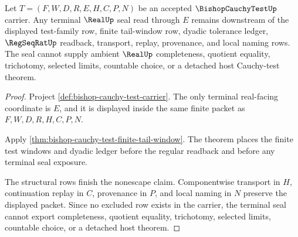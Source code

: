\begin{theorem}
\label{thm:bishop-cauchy-test-real-seal-nonescape}
Let $T=(F,W,D,R,E,H,C,P,N)$ be an accepted $\BishopCauchyTestUp$ carrier. Any terminal $\RealUp$ seal read through $E$ remains downstream of the displayed test-family row, finite tail-window row, dyadic tolerance ledger, $\RegSeqRatUp$ readback, transport, replay, provenance, and local naming rows. The seal cannot supply ambient $\RealUp$ completeness, quotient equality, trichotomy, selected limits, countable choice, or a detached host Cauchy-test theorem.
\end{theorem}
\begin{proof}
Project \autoref{def:bishop-cauchy-test-carrier}. The only terminal real-facing coordinate is $E$, and it is displayed inside the same finite packet as $F,W,D,R,H,C,P,N$.

Apply \autoref{thm:bishop-cauchy-test-finite-tail-window}. The theorem places the finite test windows and dyadic ledger before the regular readback and before any terminal seal exposure.

The structural rows finish the nonescape claim. Componentwise transport in $H$, continuation replay in $C$, provenance in $P$, and local naming in $N$ preserve the displayed packet. Since no excluded row exists in the carrier, the terminal seal cannot export completeness, quotient equality, trichotomy, selected limits, countable choice, or a detached host theorem.
\end{proof}


\begin{closurestatus}{\BishopCauchyTestUp}
  \theoryclosure{\seedClosure}
  \formalstatus{\formalTargetV}
\end{closurestatus}
